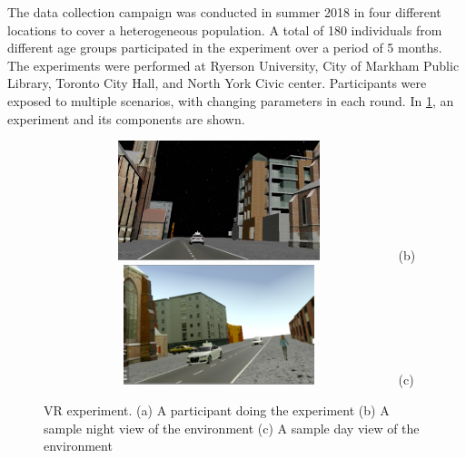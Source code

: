 The data collection campaign was conducted in summer 2018 in four different locations to cover a heterogeneous population. A total of 180 individuals from different age groups participated in the experiment over a period of 5 months. The experiments were performed at Ryerson University, City of Markham Public Library, Toronto City Hall, and North York Civic center. Participants were exposed to multiple scenarios, with changing parameters in each round. In \cref{fig:Texp}, an experiment and its components are shown.
\begin{figure}
\centering
{}
\usebox{\measurebox}\qquad
    \begin{minipage}[b][\ht\measurebox][s]{.4\textwidth}
    \centering
    \subfloat
    {\label{fig:figB}\includegraphics[width=0.91\textwidth,height=3.5cm]{chapter_6/figures/img3.png}}
    (b)
    \vfill
    \subfloat
    {\label{fig:figC}\includegraphics[width=0.91\textwidth,height=3.5cm]{chapter_6/figures/pic1.png}}
    (c)
    \end{minipage}
\caption{VR experiment. (a) A participant doing the experiment (b) A sample night view of the environment (c) A sample day view of the environment}
\label{fig:Texp}
\end{figure}

